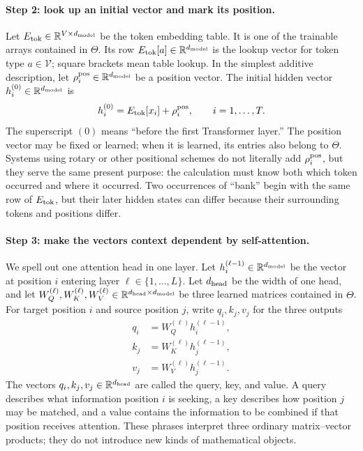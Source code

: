 \documentclass[
  aps,
  reprint,
  superscriptaddress,
  floatfix,
  nofootinbib,
  longbibliography
]{revtex4-2}
\newcommand{\R}{\mathbb{R}}
\begin{document}
\paragraph{Step 2: look up an initial vector and mark its position.}
Let $E_{\rm tok}\in\R^{V\times d_{\rm model}}$ be the token embedding table.  It is one of
the trainable arrays contained in $\Theta$.  Its row
$E_{\rm tok}[a]\in\R^{d_{\rm model}}$ is the lookup vector for token type
$a\in\mathcal V$; square brackets mean table lookup.  In the simplest additive
description, let $\rho_i^{\rm pos}\in\R^{d_{\rm model}}$ be a position vector.
The initial hidden vector $h_i^{(0)}\in\R^{d_{\rm model}}$ is
\begin{equation}
\label{eq:app-initial-state}
h_i^{(0)}=E_{\rm tok}[x_i]+\rho_i^{\rm pos},
\qquad i=1,\ldots,T.
\end{equation}
The superscript $(0)$ means ``before the first Transformer layer.''  The
position vector may be fixed or learned; when it is learned, its entries also
belong to $\Theta$.  Systems using rotary or other positional schemes do not literally add
$\rho_i^{\rm pos}$, but they
serve the same present purpose: the calculation must know both which token
occurred and where it occurred.  Two occurrences of ``bank'' begin with the
same row of $E_{\rm tok}$, but their later hidden states can differ because
their surrounding tokens and positions differ.

\paragraph{Step 3: make the vectors context dependent by self-attention.}
We spell out one attention head in one layer.  Let
$h_i^{(\ell-1)}\in\R^{d_{\rm model}}$ be the vector at position $i$ entering layer
$\ell\in\{1,\ldots,L\}$.  Let $d_{\rm head}$ be the width of one head, and let
$W_Q^{(\ell)},W_K^{(\ell)},W_V^{(\ell)}\in
\R^{d_{\rm head}\times d_{\rm model}}$ be three learned matrices contained in
$\Theta$.  For target position $i$ and source position $j$, write
$q_i,k_j,v_j$ for the three outputs
\begin{equation}
\label{eq:app-qkv}
\begin{aligned}
q_i&=W_Q^{(\ell)}h_i^{(\ell-1)},\\
k_j&=W_K^{(\ell)}h_j^{(\ell-1)},\\
v_j&=W_V^{(\ell)}h_j^{(\ell-1)}.
\end{aligned}
\end{equation}
The vectors $q_i,k_j,v_j\in\R^{d_{\rm head}}$ are called the query, key, and
value.  A query describes what information position $i$ is seeking, a key
describes how position $j$ may be matched, and a value contains the information
to be combined if that position receives attention.  These phrases interpret
three ordinary matrix--vector products; they do not introduce new kinds of
mathematical objects.
\end{document}
